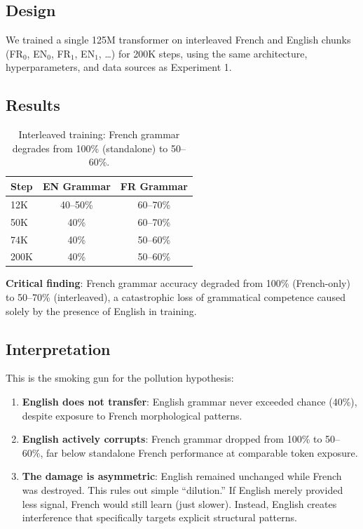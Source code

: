 \documentclass[11pt,a4paper]{article}
\begin{document}
\subsection{Design}

We trained a single 125M transformer on interleaved French and English chunks (FR$_0$, EN$_0$, FR$_1$, EN$_1$, \ldots) for 200K steps, using the same architecture, hyperparameters, and data sources as Experiment 1.

\subsection{Results}

\begin{table}[h]
\centering
\begin{tabular}{lcc}
\toprule
Step & EN Grammar & FR Grammar \\
\midrule
12K & 40--50\% & 60--70\% \\
50K & 40\% & 60--70\% \\
74K & 40\% & 50--60\% \\
200K & 40\% & 50--60\% \\
\bottomrule
\end{tabular}
\caption{Interleaved training: French grammar degrades from 100\% (standalone) to 50--60\%.}
\end{table}

\textbf{Critical finding}: French grammar accuracy degraded from 100\% (French-only) to 50--70\% (interleaved), a catastrophic loss of grammatical competence caused solely by the presence of English in training.

\subsection{Interpretation}

This is the smoking gun for the pollution hypothesis:

\begin{enumerate}
    \item \textbf{English does not transfer}: English grammar never exceeded chance (40\%), despite exposure to French morphological patterns.
    \item \textbf{English actively corrupts}: French grammar dropped from 100\% to 50--60\%, far below standalone French performance at comparable token exposure.
    \item \textbf{The damage is asymmetric}: English remained unchanged while French was destroyed. This rules out simple ``dilution.'' If English merely provided less signal, French would still learn (just slower). Instead, English creates interference that specifically targets explicit structural patterns.
\end{enumerate}
\end{document}
